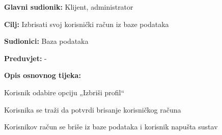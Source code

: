 						\noindent {}
						\begin{packed_item}
							
							\item \textbf{Glavni sudionik: }Klijent, administrator
							\item  \textbf{Cilj:} Izbrisati svoj korisnički račun iz baze podataka
							\item  \textbf{Sudionici:} Baza podataka
							\item  \textbf{Preduvjet:} -
							\item  \textbf{Opis osnovnog tijeka:}
							
							\item[] \begin{packed_enum}
								
								\item Korisnik odabire opciju „Izbriši profil“
								\item Korisnika se traži da potvrdi brisanje korisničkog računa
								\item Korisnikov račun se briše iz baze podataka i korisnik napušta sustav
								
							\end{packed_enum}
							
						\end{packed_item}
						
